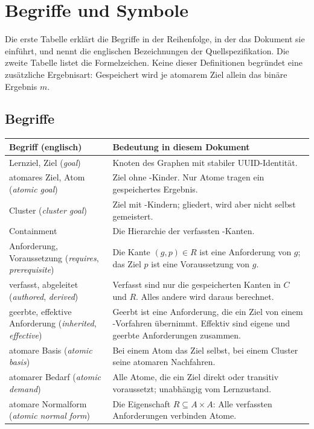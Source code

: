 \section{Begriffe und Symbole}
\label{sec:glossary}
Die erste Tabelle erklärt die Begriffe in der Reihenfolge, in der das
Dokument sie einführt, und nennt die englischen Bezeichnungen der
Quellspezifikation. Die zweite Tabelle listet die Formelzeichen. Keine
dieser Definitionen begründet eine zusätzliche Ergebnisart: Gespeichert
wird je atomarem Ziel allein das binäre Ergebnis $m$.

\subsection{Begriffe}
\begingroup\small
\begin{longtable}{@{}P{42mm}P{106mm}@{}}
\toprule
Begriff (englisch) & Bedeutung in diesem Dokument\\
\midrule\endhead
Lernziel, Ziel (\emph{goal}) & Knoten des Graphen mit stabiler
UUID-Identität.\\
atomares Ziel, Atom (\emph{atomic goal}) & Ziel ohne
-Kinder. Nur Atome tragen ein gespeichertes Ergebnis.\\
Cluster (\emph{cluster goal}) & Ziel mit -Kindern; gliedert,
wird aber nicht selbst gemeistert.\\
Containment & Die Hierarchie der verfassten -Kanten.\\
Anforderung, Voraussetzung (\emph{requires}, \emph{prerequisite}) & Die
Kante $(g,p)\in R$ ist eine Anforderung von $g$; das Ziel $p$ ist eine
Voraussetzung von $g$.\\
verfasst, abgeleitet (\emph{authored}, \emph{derived}) & Verfasst sind nur
die gespeicherten Kanten in $C$ und $R$. Alles andere wird daraus
berechnet.\\
geerbte, effektive Anforderung (\emph{inherited}, \emph{effective}) &
Geerbt ist eine Anforderung, die ein Ziel von einem
-Vorfahren übernimmt. Effektiv sind eigene und geerbte
Anforderungen zusammen.\\
atomare Basis (\emph{atomic basis}) & Bei einem Atom das Ziel selbst, bei
einem Cluster seine atomaren Nachfahren.\\
atomarer Bedarf (\emph{atomic demand}) & Alle Atome, die ein Ziel direkt
oder transitiv voraussetzt; unabhängig vom Lernzustand.\\
atomare Normalform (\emph{atomic normal form}) & Die Eigenschaft
$R\subseteq A\times A$: Alle verfassten Anforderungen verbinden Atome.\\

\end{longtable}
